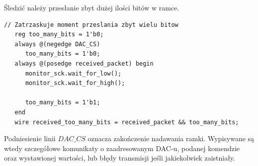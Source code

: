 \documentclass[a4paper,12pt]{article}
\begin{document}
Śledzić należy przesłanie zbyt dużej ilości bitów w ramce.
\begin{lstlisting}[label=DacLTC2624Behav,caption=DacLTC2624Behav.v,firstnumber=185]
   // Zatrzaskuje moment przeslania zbyt wielu bitow
   reg too_many_bits = 1'b0;
   always @(negedge DAC_CS)
      too_many_bits = 1'b0;
   always @(posedge received_packet) begin
      monitor_sck.wait_for_low();
      monitor_sck.wait_for_high();

      too_many_bits = 1'b1;
   end
   wire received_too_many_bits = received_packet && too_many_bits;
\end{lstlisting}

Podniesienie linii $DAC\_CS$ oznacza zakończenie nadawania ramki. Wypisywane są wtedy szczegółowe komunikaty o zaadresowanym DAC-u, podanej komendzie oraz wystawionej wartości, lub błędy transmisji jeśli jakiekolwiek zaistniały.
\end{document}
